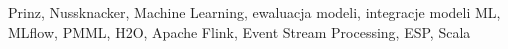 Prinz, Nussknacker, Machine Learning, ewaluacja modeli, integracje modeli ML, MLflow, PMML, H2O, Apache Flink, Event Stream Processing, ESP, Scala
